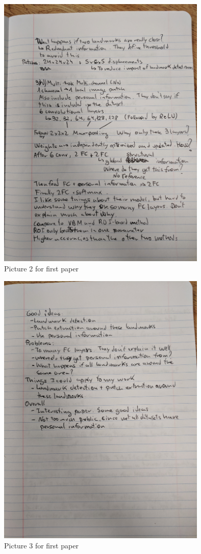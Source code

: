 \documentclass{article}
\begin{document}
\begin{figure}[h]
\centering
\includegraphics[width=10cm]{paper1_2.jpg}
\caption{Picture 2 for first paper}
\label{fig:paper1_2}
\end{figure}

\begin{figure}[h]
\centering
\includegraphics[width=10cm]{paper1_3.jpg}
\caption{Picture 3 for first paper}
\label{fig:paper1_3}
\end{figure}
\end{document}
